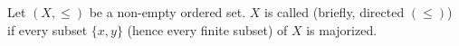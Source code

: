 Let $(X, \leq)$ be a non-empty ordered set. $X$ is called  (briefly, directed $(\leq)$) if every subset $\{x, y\}$ (hence every finite subset) of $X$ is majorized.
